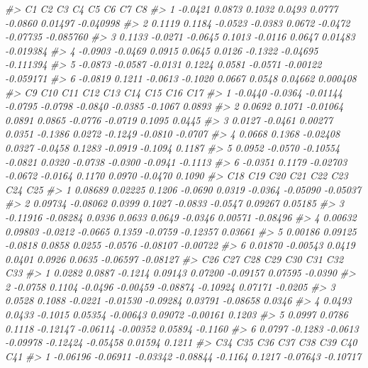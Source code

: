 \documentclass[]{book}
\newenvironment{Shaded}{\begin{snugshade}}{\end{snugshade}}
\newcommand{\CommentTok}[1]{\textcolor[rgb]{0.56,0.35,0.01}{\textit{#1}}}
\begin{document}
\begin{Shaded}
\begin{Highlighting}[]
{{{{{\CommentTok{#>        C1      C2      C3      C4      C5      C6       C7        C8}
\CommentTok{#> 1 -0.0421  0.0873  0.1032  0.0493  0.0777 -0.0860  0.01497 -0.040998}
\CommentTok{#> 2  0.1119  0.1184 -0.0523 -0.0383  0.0672 -0.0472 -0.07735 -0.085760}
\CommentTok{#> 3  0.1133 -0.0271 -0.0645  0.1013 -0.0116  0.0647  0.01483 -0.019384}
\CommentTok{#> 4 -0.0903 -0.0469  0.0915  0.0645  0.0126 -0.1322 -0.04695 -0.111394}
\CommentTok{#> 5 -0.0873 -0.0587 -0.0131  0.1224  0.0581 -0.0571 -0.00122 -0.059171}
\CommentTok{#> 6 -0.0819  0.1211 -0.0613 -0.1020  0.0667  0.0548  0.04662  0.000408}
\CommentTok{#>        C9     C10      C11     C12     C13     C14     C15     C16     C17}
\CommentTok{#> 1 -0.0440 -0.0364 -0.01144 -0.0795 -0.0798 -0.0840 -0.0385 -0.1067  0.0893}
\CommentTok{#> 2  0.0692  0.1071 -0.01064  0.0891  0.0865 -0.0776 -0.0719  0.1095  0.0445}
\CommentTok{#> 3  0.0127 -0.0461  0.00277  0.0351 -0.1386  0.0272 -0.1249 -0.0810 -0.0707}
\CommentTok{#> 4  0.0668  0.1368 -0.02408  0.0327 -0.0458  0.1283 -0.0919 -0.1094  0.1187}
\CommentTok{#> 5  0.0952 -0.0570 -0.10554 -0.0821  0.0320 -0.0738 -0.0300 -0.0941 -0.1113}
\CommentTok{#> 6 -0.0351  0.1179 -0.02703 -0.0672 -0.0164  0.1170  0.0970 -0.0470  0.1090}
\CommentTok{#>        C18      C19     C20     C21     C22     C23      C24      C25}
\CommentTok{#> 1  0.08689  0.02225  0.1206 -0.0690  0.0319 -0.0364 -0.05090 -0.05037}
\CommentTok{#> 2  0.09734 -0.08062  0.0399  0.1027 -0.0833 -0.0547  0.09267  0.05185}
\CommentTok{#> 3 -0.11916 -0.08284  0.0336  0.0633  0.0649 -0.0346  0.00571 -0.08496}
\CommentTok{#> 4  0.00632  0.09803 -0.0212 -0.0665  0.1359 -0.0759 -0.12357  0.03661}
\CommentTok{#> 5  0.00186  0.09125 -0.0818  0.0858  0.0255 -0.0576 -0.08107 -0.00722}
\CommentTok{#> 6  0.01870 -0.00543  0.0419  0.0401  0.0926  0.0635 -0.06597 -0.08127}
\CommentTok{#>       C26     C27     C28      C29      C30      C31      C32     C33}
\CommentTok{#> 1  0.0282  0.0887 -0.1214  0.09143  0.07200 -0.09157  0.07595 -0.0390}
\CommentTok{#> 2 -0.0758  0.1104 -0.0496 -0.00459 -0.08874 -0.10924  0.07171 -0.0205}
\CommentTok{#> 3  0.0528  0.1088 -0.0221 -0.01530 -0.09284  0.03791 -0.08658  0.0346}
\CommentTok{#> 4  0.0493  0.0433 -0.1015  0.05354 -0.00643  0.09072 -0.00161  0.1203}
\CommentTok{#> 5  0.0997  0.0786  0.1118 -0.12147 -0.06114 -0.00352  0.05894 -0.1160}
\CommentTok{#> 6  0.0797 -0.1283 -0.0613 -0.09978 -0.12424 -0.05458  0.01594  0.1211}
\CommentTok{#>        C34      C35      C36      C37     C38     C39      C40      C41}
\CommentTok{#> 1 -0.06196 -0.06911 -0.03342 -0.08844 -0.1164  0.1217 -0.07643 -0.10717}
}}}}}
\end{Highlighting}
\end{Shaded}
\end{document}
